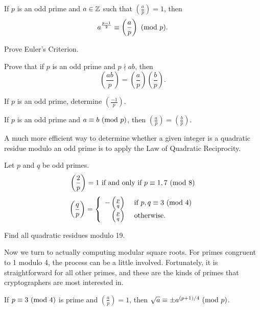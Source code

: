 \begin{theorem}
If $p$ is an odd prime and $a\in\mathbb{Z}$ such that $\left(\frac{a}{p}\right)=1$, then
$$a^{\frac{p-1}{2}} \equiv \left(\frac{a}{p}\right) \mbox{\ $\left(\mathrm{mod}\ {p}\right)$}.$$
\end{theorem}

\begin{problem}[15 points]
Prove Euler's Criterion.
\end{problem}

\begin{problem}[15 points]
Prove that if $p$ is an odd prime and $p\nmid ab$, then
$$\left(\frac{ab}{p}\right) = \left(\frac{a}{p}\right)\left(\frac{b}{p}\right).$$
\end{problem}

\begin{problem}[10 points]
If $p$ is an odd prime, determine $\left(\frac{-1}{p}\right)$.
\end{problem}

\begin{problem}[10 points]
If $p$ is an odd prime and $a\equiv b \mbox{\ $\left(\mathrm{mod}\ {p}\right)$}$, then $\left(\frac{a}{p}\right)=\left(\frac{b}{p}\right)$.
\end{problem}

A much more efficient way to determine whether a given integer is a quadratic residue modulo an odd prime is to apply the Law of Quadratic Reciprocity.

\begin{theorem}
Let $p$ and $q$ be odd primes.
$$\left(\frac{2}{p}\right)=1 \mbox{ if and only if } p\equiv 1,7 \mbox{\ $\left(\mathrm{mod}\ {8}\right)$}$$
$$\left(\frac{q}{p}\right) = \left\{ \begin{array}{rl}
-\left(\frac{p}{q}\right) & \mbox{ if } p,q\equiv 3\mbox{\ $\left(\mathrm{mod}\ {4}\right)$}\\
 \left(\frac{p}{q}\right) & \mbox{ otherwise. }
\end{array}\right.$$
\end{theorem}


\begin{problem}[10 points]
Find all quadratic residues modulo 19.
\end{problem}

Now we turn to actually computing modular square roots. For primes congruent to 1 modulo 4, the process can be a little involved. Fortunately, it is straightforward for all other primes, and these are the kinds of primes that cryptographers are most interested in.

\begin{theorem}
\label{thm:sqrtmodp}
If $p\equiv 3 \mbox{\ $\left(\mathrm{mod}\ {4}\right)$}$ is prime and $\left(\frac{a}{p}\right)=1$, then $\sqrt{a} \equiv \pm a^{(p+1)/4}\mbox{\ $\left(\mathrm{mod}\ {p}\right)$}$.
\end{theorem}

